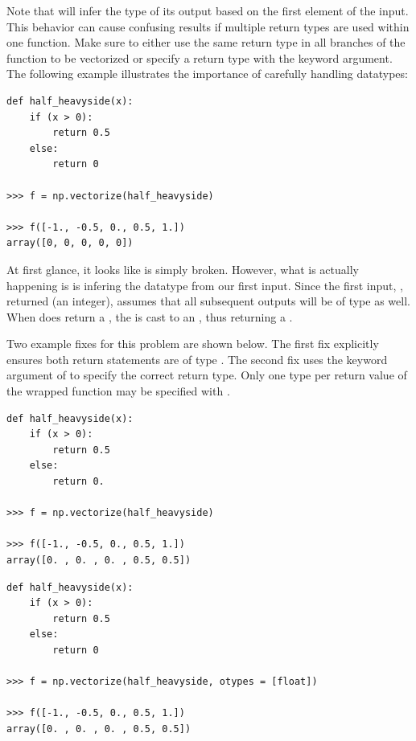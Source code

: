 \begin{warn}

Note that  will infer the type of its output based on the first element of the input.
This behavior can cause confusing results if multiple return types are used within one function.
Make sure to either use the same return type in all branches of the function to be vectorized or specify a return type with the  keyword argument.
The following example illustrates the importance of carefully handling datatypes:


\begin{lstlisting}
def half_heavyside(x):
	if (x > 0):
		return 0.5
	else:
		return 0

>>> f = np.vectorize(half_heavyside)	

>>> f([-1., -0.5, 0., 0.5, 1.])
array([0, 0, 0, 0, 0])

\end{lstlisting}

At first glance, it looks like  is simply broken. 
However, what is actually happening is  is infering the datatype from our first input. 
Since the first input, , returned  (an integer),  assumes that all subsequent outputs will be of type  as well. 
When  does return a , the  is cast to an , thus returning a . 

Two example fixes for this problem are shown below. 
The first fix explicitly ensures both return statements are of type .
The second fix uses the  keyword argument of  to specify the correct return type.
Only one type per return value of the wrapped function may be specified with . 

\begin{lstlisting}
def half_heavyside(x):
	if (x > 0):
		return 0.5
	else:
		return 0.

>>> f = np.vectorize(half_heavyside)	

>>> f([-1., -0.5, 0., 0.5, 1.])
array([0. , 0. , 0. , 0.5, 0.5])

\end{lstlisting}

\begin{lstlisting}
def half_heavyside(x):
	if (x > 0):
		return 0.5
	else:
		return 0

>>> f = np.vectorize(half_heavyside, otypes = [float])	

>>> f([-1., -0.5, 0., 0.5, 1.])
array([0. , 0. , 0. , 0.5, 0.5])

\end{lstlisting}

\end{warn}

